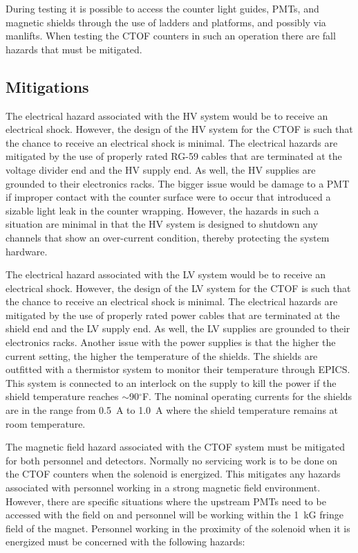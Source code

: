 During testing it is possible to access the counter light guides, PMTs, and magnetic shields
through the use of ladders and platforms, and possibly via manlifts. When testing the CTOF
counters in such an operation there are fall hazards that must be mitigated.

\subsection{Mitigations}

The electrical hazard associated with the HV system would be to receive an electrical 
shock. However, the design of the HV system for the CTOF is such that the chance to receive an 
electrical shock is minimal. The electrical hazards are mitigated by the use of properly
rated RG-59 cables that are terminated at the voltage divider end and the HV supply end. As 
well, the HV supplies are grounded to their electronics racks. The bigger issue would be 
damage to a PMT if improper contact with the counter surface were to occur that introduced a 
sizable light leak in the counter wrapping. However, the hazards in such a situation are 
minimal in that the HV system is designed to shutdown any channels that show an over-current
condition, thereby protecting the system hardware.

The electrical hazard associated with the LV system would be to receive an electrical
shock. However, the design of the LV system for the CTOF is such that the chance to receive an 
electrical shock is minimal. The electrical hazards are mitigated by the use of properly
rated power cables that are terminated at the shield end and the LV supply end. As well, 
the LV supplies are grounded to their electronics racks. Another issue with the power supplies 
is that the higher the current setting, the higher the temperature of the shields. The shields 
are outfitted with a thermistor system to monitor their temperature through EPICS. This system 
is connected to an interlock on the supply to kill the power if the shield temperature reaches 
$\sim$90$^\circ$F. The nominal operating currents for the shields are in the range from 0.5~A 
to 1.0~A where the shield temperature remains at room temperature.

The magnetic field hazard associated with the CTOF system must be mitigated for both personnel
and detectors. Normally no servicing work is to be done on the CTOF counters when the
solenoid is energized. This mitigates any hazards associated with personnel working in a strong
magnetic field environment. However, there are specific situations where the upstream PMTs need 
to be accessed with the field on and personnel will be working within the 1~kG fringe field
of the magnet. Personnel working in the proximity of the solenoid when it is energized must be
concerned with the following hazards:

